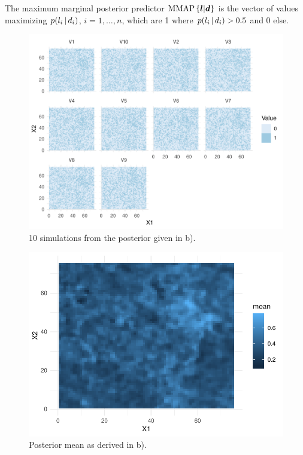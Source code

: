 The maximum marginal posterior predictor $\text{MMAP}\left\{\bm{l}|\bm{d}\right\}$ is the vector of values maximizing $p(l_i \, | \, d_i)$, $i = 1, \dots, n$, which are 1 where $p(l_i \, | \, d_i) > 0.5$ and 0 else.

\begin{figure}
    \centering
    \includegraphics{figures/b_sims.pdf}
    \caption{10 simulations from the posterior given in b).}
    \label{fig:b_sims}
\end{figure}

\begin{figure}
    \centering
    \includegraphics{figures/b_mean.pdf}
    \caption{Posterior mean as derived in b).}
    \label{fig:b_mean}
\end{figure}

